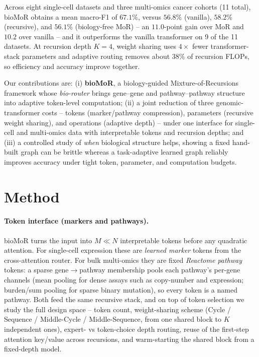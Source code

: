 \documentclass[letterpaper]{article}
\begin{document}
Across eight single-cell datasets and three multi-omics cancer cohorts (11 total),
bioMoR obtains a mean macro-F1 of $67.1\%$, versus $56.8\%$ (vanilla), $58.2\%$
(recursive), and $56.1\%$ (biology-free MoR) -- an $11.0$-point gain over MoR and
$10.2$ over vanilla -- and it outperforms the vanilla transformer on 9 of the 11
datasets. At recursion depth $K=4$, weight sharing uses $4\times$ fewer
transformer-stack parameters and adaptive routing removes about $38\%$ of recursion
FLOPs, so efficiency and accuracy improve together.

Our contributions are: (i) \textbf{bioMoR}, a biology-guided Mixture-of-Recursions
framework whose \emph{bio-router} brings gene--gene and pathway--pathway structure
into adaptive token-level computation; (ii) a joint reduction of three
genomic-transformer costs -- tokens (marker/pathway compression), parameters
(recursive weight sharing), and operations (adaptive depth) -- under one interface
for single-cell and multi-omics data with interpretable tokens and recursion
depths; and (iii) a controlled study of \emph{when} biological structure helps,
showing a fixed hand-built graph can be brittle whereas a task-adaptive learned
graph reliably improves accuracy under tight token, parameter, and computation
budgets.

\section{Method}

\paragraph{Token interface (markers and pathways).}
bioMoR turns the input into $M\ll N$ interpretable tokens before any quadratic
attention. For single-cell expression these are \emph{learned marker} tokens from the
cross-attention router. For bulk multi-omics they are fixed \emph{Reactome pathway}
tokens: a sparse gene$\to$pathway membership pools each pathway's per-gene channels
(mean pooling for dense assays such as copy-number and expression; burden/sum pooling
for sparse binary mutation), so every token is a named pathway. Both feed the same
recursive stack, and on top of token selection we study the full design space --
token count, weight-sharing scheme (Cycle / Sequence / Middle-Cycle / Middle-Sequence,
from one shared block to $K$ independent ones), expert- vs token-choice depth routing,
reuse of the first-step attention key/value across recursions, and warm-starting the
shared block from a fixed-depth model.
\end{document}
